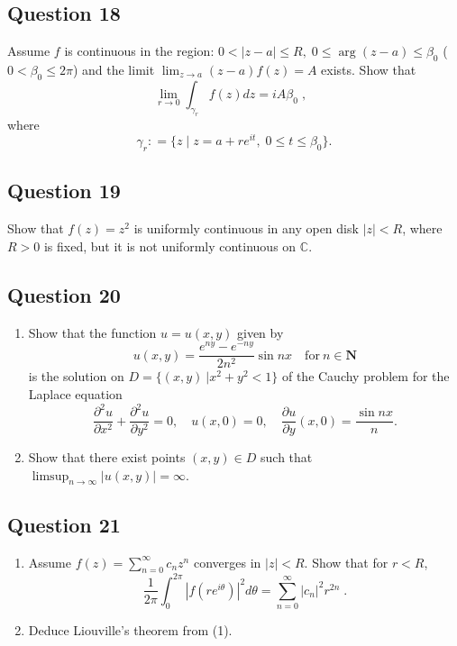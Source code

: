 \documentclass[12pt]{article}
\begin{document}
\hypertarget{question-18-2}{%
\subsection{Question 18}\label{question-18-2}}

Assume \(f\) is continuous in the region:
\(0< |z-a| \leq R, \; 0 \leq \arg(z-a) \leq \beta_0\)
(\(0 < \beta_0 \leq 2 \pi\)) and the limit
\(\displaystyle \lim_{z \rightarrow a} (z-a) f(z) = A\) exists. Show
that
\[\lim_{r \rightarrow 0} \int_{\gamma_r} f(z) dz  = i A \beta_0 \; , \; \;\]
where
\[\gamma_r : = \{ z \; | \; z = a + r e^{it}, \; 0 \leq  t \leq \beta_0 \}.\]

\hypertarget{question-19-2}{%
\subsection{Question 19}\label{question-19-2}}

Show that \(f(z) = z^2\) is uniformly continuous in any open disk
\(|z| < R\), where \(R>0\) is fixed, but it is not uniformly continuous
on \(\mathbb C\).

\hypertarget{question-20-2}{%
\subsection{Question 20}\label{question-20-2}}

\begin{enumerate}
\def\labelenumi{(\arabic{enumi})}
\item
  Show that the function \(u=u(x,y)\) given by
  \[u(x,y)=\frac{e^{ny}-e^{-ny}}{2n^2}\sin nx\quad \text{for}\ n\in {\mathbf N}\]
  is the solution on \(D=\{(x,y)\ | x^2+y^2<1\}\) of the Cauchy problem
  for the Laplace equation
  \[\frac{\partial ^2u}{\partial x^2}+\frac{\partial ^2u}{\partial y^2}=0,\quad
  u(x,0)=0,\quad \frac{\partial u}{\partial y}(x,0)=\frac{\sin nx}{n}.\]
\item
  Show that there exist points \((x,y)\in D\) such that
  \(\displaystyle{\limsup_{n\to\infty} |u(x,y)|=\infty}\).
\end{enumerate}

\hypertarget{question-21-2}{%
\subsection{Question 21}\label{question-21-2}}

\begin{enumerate}
\def\labelenumi{(\arabic{enumi})}
\item
  Assume \(\displaystyle f(z) = \sum_{n=0}^\infty c_n z^n\) converges in
  \(|z| < R\). Show that for \(r <R\),
  \[\frac{1}{2 \pi} \int_0^{2 \pi} |f(r e^{i \theta})|^2 d \theta =
  \sum_{n=0}^\infty |c_n|^2 r^{2n} \; .\]
\item
  Deduce Liouville's theorem from (1).
\end{enumerate}
\end{document}
